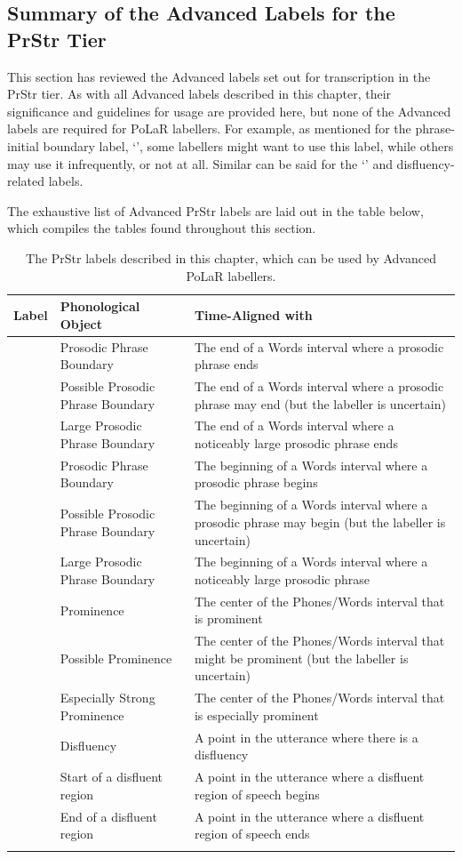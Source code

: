 \documentclass[11pt, twoside]{memoir}
\def\polar#1{{\relsize{-.5}\fontspec[Mapping=tex-text]{Roboto Mono}{#1}}}
\def\polarquot#1{‘\polar{#1}’}
\begin{document}
\subsection{Summary of the Advanced Labels for the PrStr Tier}
This section has reviewed the Advanced labels set out for transcription in the PrStr tier. As with all Advanced labels described in this chapter, their significance and guidelines for usage are provided here, but none of the Advanced labels are required for PoLaR labellers. For example, as mentioned for the phrase-initial boundary label, \polarquot{[}, some labellers might want to use this label, while others may use it infrequently, or not at all. Similar can be said for the \polarquot{**} and disfluency-related labels.

The exhaustive list of Advanced PrStr labels are laid out in the table below, which compiles the tables found throughout this section.

\begin{longtable}{cp{.3\linewidth}p{.45\linewidth}}
	\toprule
	\textbf{Label} & \textbf{Phonological Object} & \textbf{Time-Aligned with} \tabularnewline
	\midrule
	\endhead
	\rowcolor{green}
	\polar{]} & Prosodic Phrase Boundary & The end of a Words interval where a prosodic phrase ends \tabularnewline
	\polar{?]} & Possible Prosodic Phrase Boundary & The end of a Words interval where a prosodic phrase may end (but the labeller is uncertain) \tabularnewline
	\polar{]]} & Large Prosodic Phrase Boundary & The end of a Words interval where a noticeably large prosodic phrase ends \tabularnewline
	\polar{[} & Prosodic Phrase Boundary & The beginning of a Words interval where a prosodic phrase begins \tabularnewline
	\polar{?[} & Possible Prosodic Phrase Boundary & The beginning of a Words interval where a prosodic phrase may begin (but the labeller is uncertain) \tabularnewline
	\polar{[[} & Large Prosodic Phrase Boundary & The beginning of a Words interval where a noticeably large prosodic phrase \tabularnewline
	\hline
	\rowcolor{green}
	\polar{*} & Prominence & The center of the Phones\slash Words interval that is prominent\tabularnewline
	\polar{?*} & Possible Prominence & The center of the Phones\slash Words interval that might be prominent (but the labeller is uncertain) \tabularnewline
	\polar{**} & Especially Strong Prominence & The center of the Phones\slash Words interval that is especially prominent \tabularnewline
	\hline
	\polar{d} & Disfluency & A point in the utterance where there is a disfluency\tabularnewline
	\polar{\{d} & Start of a disfluent region & A point in the utterance where a disfluent region of speech begins\tabularnewline
	\polar{d\}} & End of a disfluent region & A point in the utterance where a disfluent region of speech ends\tabularnewline
	\bottomrule
	\caption{The PrStr labels described in this chapter, which can be used by Advanced PoLaR labellers.}
\end{longtable}
\end{document}
